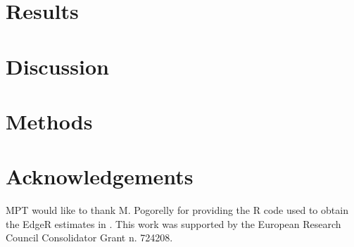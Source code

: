\documentclass[pre,twocolumn,english,longbibliography]{revtex4} %
\newcommand{\beginsupplement}{%
        \setcounter{table}{0}
        \renewcommand{\thetable}{S\arabic{table}}%
        \setcounter{figure}{0}
        \renewcommand{\thefigure}{S\arabic{figure}}%
     }
\newcommand{\<}{\langle}
\renewcommand{\>}{\rangle}
\begin{document}
\maketitle



\section*{Results}









\section*{Discussion}






\section*{Methods}







\section*{Acknowledgements}
MPT would like to thank M. Pogorelly for providing the R code used to obtain the EdgeR estimates in \citep{Pogorelyy2018c}.  This work was supported by the European Research Council Consolidator Grant n. 724208.







\newpage



\beginsupplement


\end{document}
